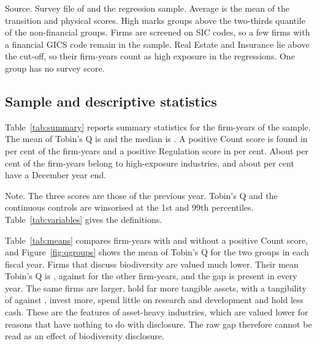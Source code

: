 \documentclass[12pt,a4paper]{article}
\newcommand{\tablenote}[1]{\par\smallskip\begin{minipage}{\linewidth}\footnotesize\setstretch{1.05}#1\end{minipage}}
\newcommand{\widetable}[1]{\resizebox{\ifdim\width>\linewidth\linewidth\else\width\fi}{!}{}}
\begin{document}
\begin{table}[!htbp]
\centering\small
\caption{Survey-based exposure and disclosure by GICS industry group}\label{tab:industry}
\widetable{tables/tab_industry}
\tablenote{Source. Survey file of \citet{giglio2026} and the regression sample. Average is the mean of the transition and physical scores. High marks groups above the two-thirds quantile of the non-financial groups. Firms are screened on SIC codes, so a few firms with a financial GICS code remain in the sample. Real Estate and Insurance lie above the cut-off, so their \nHighFinFY{} firm-years count as high exposure in the regressions. One group has no survey score.}
\end{table}

\subsection{Sample and descriptive statistics}

Table~\ref{tab:summary} reports summary statistics for the \nFinal{} firm-years of the sample. The mean of Tobin's Q is \meanQ{} and the median is \medianQ{}. A positive Count score is found in \pctCount{} per cent of the firm-years and a positive Regulation score in \pctReg{} per cent. About \pctHigh{} per cent of the firm-years belong to high-exposure industries, and about \pctDecember{} per cent have a December year end.

\begin{table}[!htbp]
\centering\small
\caption{Summary statistics}\label{tab:summary}
\widetable{tables/tab_summary}
\tablenote{Note. The three scores are those of the previous year. Tobin's Q and the continuous controls are winsorised at the 1st and 99th percentiles. Table~\ref{tab:variables} gives the definitions.}
\end{table}

Table~\ref{tab:means} compares firm-years with and without a positive Count score, and Figure~\ref{fig:qgroups} shows the mean of Tobin's Q for the two groups in each fiscal year. Firms that discuss biodiversity are valued much lower. Their mean Tobin's Q is \meanQOne{}, against \meanQZero{} for the other firm-years, and the gap is present in every year. The same firms are larger, hold far more tangible assets, with a tangibility of \tangOne{} against \tangZero{}, invest more, spend little on research and development and hold less cash. These are the features of asset-heavy industries, which are valued lower for reasons that have nothing to do with disclosure. The raw gap therefore cannot be read as an effect of biodiversity disclosure.
\end{document}
